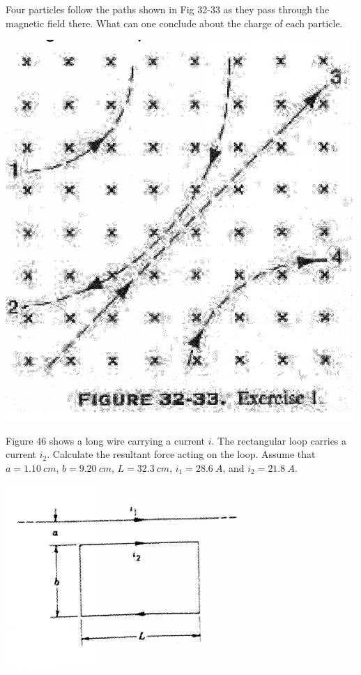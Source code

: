 \documentclass[12pt,letterpaper,boxed,cm]{hmcpset}
\begin{document}
\begin{problem}[32-E1*]
	Four particles follow the paths shown in Fig 32-33 as they pass through the magnetic field there. What can one conclude about the charge of each particle.
	\begin{center}
		\includegraphics[scale=0.7]{03.png}	
	\end{center}
\end{problem}
\begin{solution}
\end{solution}


\newpage
\begin{problem}[33-E24]
	Figure 46 shows a long wire carrying a current $i$. The rectangular loop carries a current $i_2$. Calculate the resultant force acting on the loop. Assume that $a = \SI{1.10}{cm}$, $b = \SI{9.20}{cm}$, $L = \SI{32.3}{cm}$, $i_1 = \SI{28.6}{A}$, and $i_2 = \SI{21.8}{A}$.	
	\begin{center}
		\includegraphics[scale=1.4]{04.png}	
	\end{center}
\end{problem}
\begin{solution}
\end{solution}
\end{document}
